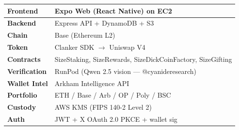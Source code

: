 \documentclass{article}
\begin{document}
\begin{center}
\begin{tabular}{|l|l|}
\hline
\textbf{Frontend}     & Expo Web (React Native) on EC2 \\
\hline
\textbf{Backend}      & Express API + DynamoDB + S3 \\
\hline
\textbf{Chain}        & Base (Ethereum L2) \\
\hline
\textbf{Token}        & Clanker SDK $\rightarrow$ Uniswap V4 \\
\hline
\textbf{Contracts}    & SizeStaking, SizeRewards, SizeDickCoinFactory, SizeGifting \\
\hline
\textbf{Verification} & RunPod (Qwen 2.5 vision — @cyanideresearch) \\
\hline
\textbf{Wallet Intel} & Arkham Intelligence API \\
\hline
\textbf{Portfolio}    & ETH / Base / Arb / OP / Poly / BSC \\
\hline
\textbf{Custody}      & AWS KMS (FIPS 140-2 Level 2) \\
\hline
\textbf{Auth}         & JWT + X OAuth 2.0 PKCE + wallet sig \\
\hline
\end{tabular}
\end{center}
\end{document}
